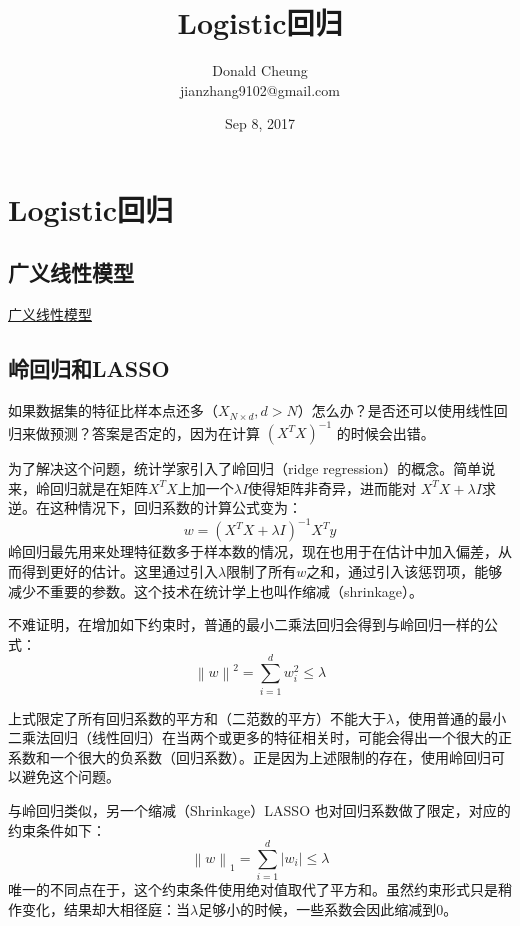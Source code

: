 \documentclass[10pt,a4paper]{ctexbook}
\begin{document}
    \setlength{\baselineskip}{20pt}
    \title{Logistic回归}
    \author{Donald Cheung\\jianzhang9102@gmail.com}
    \date{Sep 8, 2017}
    \tableofcontents
\fi

\chapter{Logistic回归}

\section{广义线性模型}

\href{http://blog.csdn.net/acdreamers/article/details/44663091}{广义线性模型}


\section{岭回归和LASSO}
如果数据集的特征比样本点还多（$X_{N \times d}, d>N$）怎么办？是否还可以使用线性回归来做预测？答案是否定的，因为在计算 $(X^{T}X)^{-1}$ 的时候会出错。

为了解决这个问题，统计学家引入了岭回归（ridge regression）的概念。简单说来，岭回归就是在矩阵$X^{T}X$上加一个$\lambda I$使得矩阵非奇异，进而能对 $X^{T}X+\lambda I$求逆。在这种情况下，回归系数的计算公式变为：
\[
w=(X^{T}X+\lambda I)^{-1}X^{T}y
\]
岭回归最先用来处理特征数多于样本数的情况，现在也用于在估计中加入偏差，从而得到更好的估计。这里通过引入$\lambda$限制了所有$w$之和，通过引入该惩罚项，能够减少不重要的参数。这个技术在统计学上也叫作缩减（shrinkage）。

不难证明，在增加如下约束时，普通的最小二乘法回归会得到与岭回归一样的公式： 
\[
\left\|w\right\|^{2} = \sum\limits_{i=1}^{d}{w_{i}^{2}} \le \lambda
\]

上式限定了所有回归系数的平方和（二范数的平方）不能大于$\lambda$，使用普通的最小二乘法回归（线性回归）在当两个或更多的特征相关时，可能会得出一个很大的正系数和一个很大的负系数（回归系数）。正是因为上述限制的存在，使用岭回归可以避免这个问题。

与岭回归类似，另一个缩减（Shrinkage）LASSO 也对回归系数做了限定，对应的约束条件如下： 
\[
\left\|w\right\|_{1}=\sum\limits_{i=1}^{d}{|w_{i}|} \le \lambda
\]
唯一的不同点在于，这个约束条件使用绝对值取代了平方和。虽然约束形式只是稍作变化，结果却大相径庭：当$\lambda$足够小的时候，一些系数会因此缩减到0。
\end{document}
